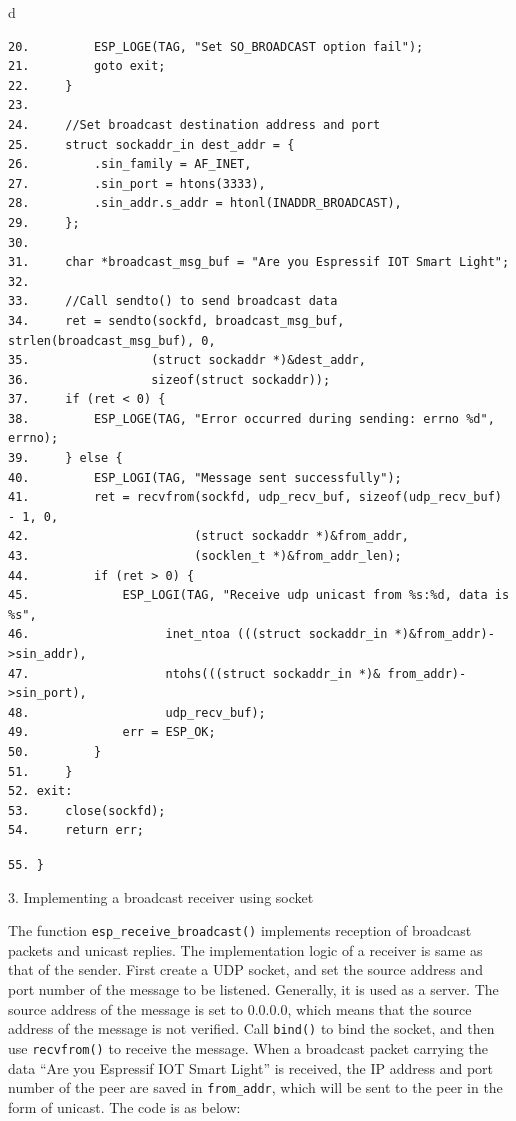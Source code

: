 \documentclass[a4paper,12pt,openany]{book}
\renewcommand{\ttfamily}{\fontfamily{pcr}\selectfont}
\renewcommand{\arraystretch}{1}
\newenvironment{codebloc}{ %
    \ttfamily\footnotesize
    \renewcommand{\arraystretch}{1}
}
\newcommand{\note}[2][NOTE]{ %
\vspace{6pt}
\begin{tabular}{b{\textwidth}}
\hline
\fontfamily{phv}\selectfont \textbf{#1}\\
\leftskip 1em #2\\
\hline
\end{tabular}
}
\begin{document}
\begin{codebloc}
\begin{tabular}{d}
\vspace{2pt}
\begin{verbatim}
20.         ESP_LOGE(TAG, "Set SO_BROADCAST option fail");
21.         goto exit;
22.     }
23. 	
24.     //Set broadcast destination address and port
25.     struct sockaddr_in dest_addr = {
26.         .sin_family = AF_INET,
27.         .sin_port = htons(3333),
28.         .sin_addr.s_addr = htonl(INADDR_BROADCAST),
29.     };
30.	
31.     char *broadcast_msg_buf = "Are you Espressif IOT Smart Light";
32.	
33.     //Call sendto() to send broadcast data
34.     ret = sendto(sockfd, broadcast_msg_buf, strlen(broadcast_msg_buf), 0,
35.                 (struct sockaddr *)&dest_addr,
36.                 sizeof(struct sockaddr));
37.     if (ret < 0) {
38.         ESP_LOGE(TAG, "Error occurred during sending: errno %d", errno);
39.     } else {
40.         ESP_LOGI(TAG, "Message sent successfully");
41.         ret = recvfrom(sockfd, udp_recv_buf, sizeof(udp_recv_buf) - 1, 0,
42.                       (struct sockaddr *)&from_addr,
43.                       (socklen_t *)&from_addr_len);
44.         if (ret > 0) {
45.             ESP_LOGI(TAG, "Receive udp unicast from %s:%d, data is %s",
46.                   inet_ntoa (((struct sockaddr_in *)&from_addr)->sin_addr),
47.                   ntohs(((struct sockaddr_in *)& from_addr)->sin_port),
48.                   udp_recv_buf);
49.             err = ESP_OK;
50.         }
51.     }
52. exit:
53.     close(sockfd);
54.     return err;
\end{verbatim}
\verb|55. }|
\end{tabular}
\end{codebloc}

\subsubsection{3. Implementing a broadcast receiver using socket}

The function \verb|esp_receive_broadcast()| implements reception of broadcast packets and unicast replies. The implementation logic of a receiver is same as that of the sender. First create a UDP socket, and set the source address and port number of the message to be listened. Generally, it is used as a server. The source address of the message is set to 0.0.0.0, which means that the source address of the message is not verified. Call \verb|bind()| to bind the socket, and then use \verb|recvfrom()| to receive the message. When a broadcast packet carrying the data “Are you Espressif IOT Smart Light” is received, the IP address and port number of the peer are saved in \verb|from_addr|, which will be sent to the peer in the form of unicast. The code is as below:
\end{document}
